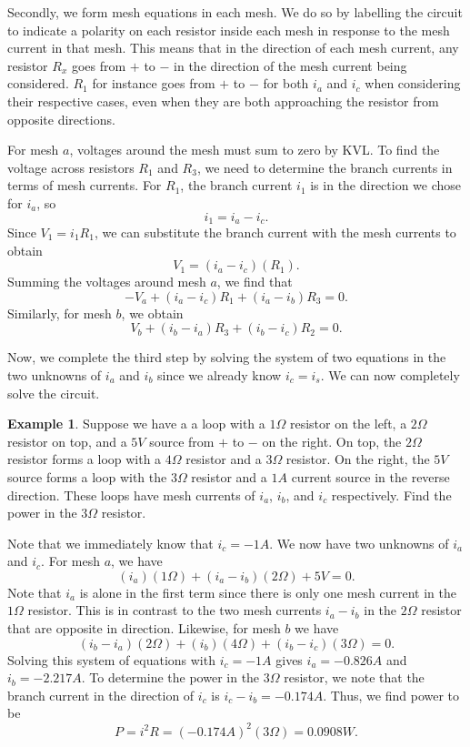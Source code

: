 \documentclass[11pt]{article}
\theoremstyle{plain} %
\theoremstyle{definition}
\theoremstyle{example}
\newtheorem*{example}{Example}
\theoremstyle{remark}
\begin{document}
Secondly, we form mesh equations in each mesh. We do so by labelling the circuit to indicate a polarity on each resistor inside each mesh in response to the mesh current in that mesh. This means that in the direction of each mesh current, any resistor $R_x$ goes from $+$ to $-$ in the direction of the mesh current being considered. $R_1$ for instance goes from $+$ to $-$ for both $i_a$ and $i_c$ when considering their respective cases, even when they are both approaching the resistor from opposite directions. 

For mesh $a$, voltages around the mesh must sum to zero by KVL. To find the voltage across resistors $R_1$ and $R_3$, we need to determine the branch currents in terms of mesh currents. For $R_1$, the branch current $i_1$ is in the direction we chose for $i_a$, so 
$$i_1 = i_a-i_c.$$
Since $V_1 = i_1R_1$, we can substitute the branch current with the mesh currents to obtain 
$$V_1 = (i_a-i_c)(R_1).$$
Summing the voltages around mesh $a$, we find that 
$$-V_a+(i_a-i_c)R_1 + (i_a-i_b)R_3 = 0.$$
Similarly, for mesh $b$, we obtain
$$V_b + (i_b-i_a)R_3 + (i_b-i_c)R_2=0.$$

Now, we complete the third step by solving the system of two equations in the two unknowns of $i_a$ and $i_b$ since we already know $i_c = i_s$. We can now completely solve the circuit. 

\begin{example}
Suppose we have a a loop with a $1\Omega$ resistor on the left, a $2\Omega$ resistor on top, and a $5V$ source from $+$ to $-$ on the right. On top, the $2\Omega$ resistor forms a loop with a $4\Omega$ resistor and a $3\Omega$ resistor. On the right, the $5V$ source forms a loop with the $3\Omega$ resistor and a $1A$ current source in the reverse direction. These loops have mesh currents of $i_a$, $i_b$, and $i_c$ respectively. Find the power in the $3\Omega$ resistor.  
\end{example}

Note that we immediately know that $i_c = -1A$. We now have two unknowns of $i_a$ and $i_c$. 
For mesh $a$, we have 
$$(i_a)(1\Omega) + (i_a-i_b)(2\Omega) + 5V = 0.$$
Note that $i_a$ is alone in the first term since there is only one mesh current in the $1\Omega$ resistor. This is in contrast to the two mesh currents $i_a-i_b$ in the $2\Omega$ resistor that are opposite in direction. Likewise, for mesh $b$ we have
$$(i_b-i_a)(2\Omega) + (i_b)(4\Omega) + (i_b-i_c)(3\Omega) = 0.$$
Solving this system of equations with $i_c = -1A$ gives $i_a = -0.826A$ and $i_b=-2.217A$. To determine the power in the $3\Omega$ resistor, we note that the branch current in the direction of $i_c$ is $i_c-i_b = -0.174A$. Thus, we find power to be 
$$P = i^2R = (-0.174A)^2(3\Omega) = 0.0908W.$$
\end{document}
